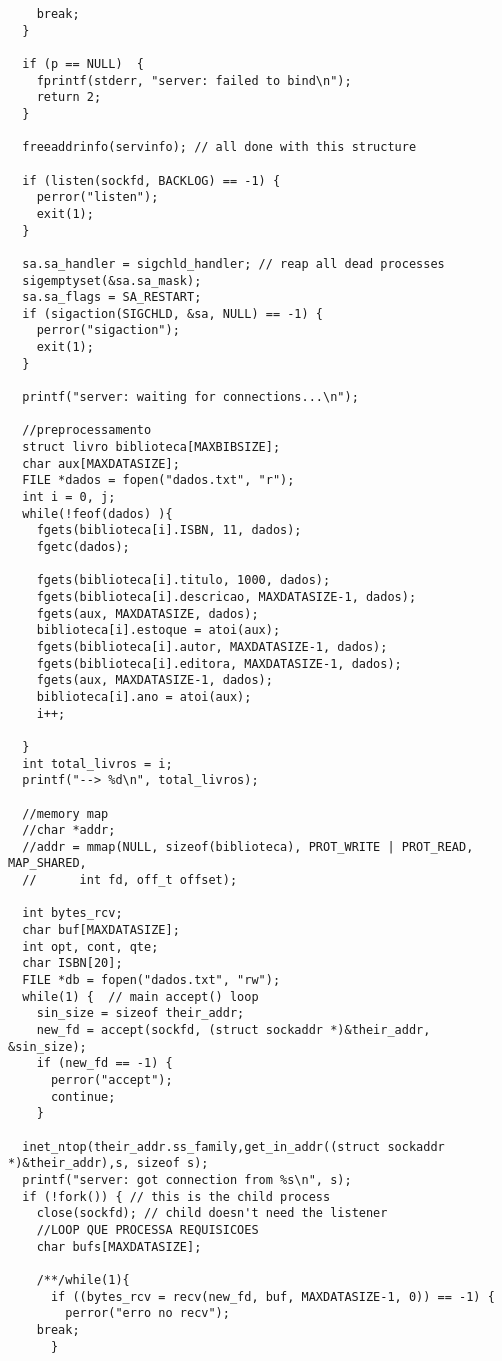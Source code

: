 \documentclass[11pt, brazil]{article} %
\begin{document}
\begin{verbatim}
    break;
  }

  if (p == NULL)  {
    fprintf(stderr, "server: failed to bind\n");
    return 2;
  }

  freeaddrinfo(servinfo); // all done with this structure

  if (listen(sockfd, BACKLOG) == -1) {
    perror("listen");
    exit(1);
  }

  sa.sa_handler = sigchld_handler; // reap all dead processes
  sigemptyset(&sa.sa_mask);
  sa.sa_flags = SA_RESTART;
  if (sigaction(SIGCHLD, &sa, NULL) == -1) {
    perror("sigaction");
    exit(1);
  }

  printf("server: waiting for connections...\n");

  //preprocessamento
  struct livro biblioteca[MAXBIBSIZE];
  char aux[MAXDATASIZE];
  FILE *dados = fopen("dados.txt", "r");
  int i = 0, j;
  while(!feof(dados) ){
    fgets(biblioteca[i].ISBN, 11, dados);
    fgetc(dados);
		
    fgets(biblioteca[i].titulo, 1000, dados);
    fgets(biblioteca[i].descricao, MAXDATASIZE-1, dados);
    fgets(aux, MAXDATASIZE, dados);
    biblioteca[i].estoque = atoi(aux);
    fgets(biblioteca[i].autor, MAXDATASIZE-1, dados);
    fgets(biblioteca[i].editora, MAXDATASIZE-1, dados);
    fgets(aux, MAXDATASIZE-1, dados);
    biblioteca[i].ano = atoi(aux);
    i++;
		
  }
  int total_livros = i;
  printf("--> %d\n", total_livros);
	
  //memory map
  //char *addr;
  //addr = mmap(NULL, sizeof(biblioteca), PROT_WRITE | PROT_READ, MAP_SHARED,
  //      int fd, off_t offset);
	
  int bytes_rcv;
  char buf[MAXDATASIZE];
  int opt, cont, qte;
  char ISBN[20];
  FILE *db = fopen("dados.txt", "rw");
  while(1) {  // main accept() loop
    sin_size = sizeof their_addr;
    new_fd = accept(sockfd, (struct sockaddr *)&their_addr, &sin_size);
    if (new_fd == -1) {
      perror("accept");
      continue;
    }

  inet_ntop(their_addr.ss_family,get_in_addr((struct sockaddr *)&their_addr),s, sizeof s);
  printf("server: got connection from %s\n", s);
  if (!fork()) { // this is the child process
    close(sockfd); // child doesn't need the listener
    //LOOP QUE PROCESSA REQUISICOES
    char bufs[MAXDATASIZE];

    /**/while(1){		
      if ((bytes_rcv = recv(new_fd, buf, MAXDATASIZE-1, 0)) == -1) {
        perror("erro no recv");
	break;
      }
		    	

\end{verbatim}
\end{document}
